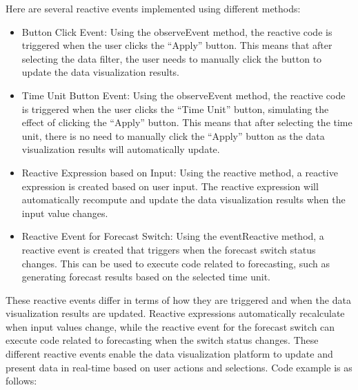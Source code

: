 \documentclass[
  11pt,
]{article}
\begin{document}
Here are several reactive events implemented using different methods:

\begin{itemize}
\item
  Button Click Event: Using the observeEvent method, the reactive code
  is triggered when the user clicks the ``Apply'' button. This means
  that after selecting the data filter, the user needs to manually click
  the button to update the data visualization results.
\item
  Time Unit Button Event: Using the observeEvent method, the reactive
  code is triggered when the user clicks the ``Time Unit'' button,
  simulating the effect of clicking the ``Apply'' button. This means
  that after selecting the time unit, there is no need to manually click
  the ``Apply'' button as the data visualization results will
  automatically update.
\item
  Reactive Expression based on Input: Using the reactive method, a
  reactive expression is created based on user input. The reactive
  expression will automatically recompute and update the data
  visualization results when the input value changes.
\item
  Reactive Event for Forecast Switch: Using the eventReactive method, a
  reactive event is created that triggers when the forecast switch
  status changes. This can be used to execute code related to
  forecasting, such as generating forecast results based on the selected
  time unit.
\end{itemize}

These reactive events differ in terms of how they are triggered and when
the data visualization results are updated. Reactive expressions
automatically recalculate when input values change, while the reactive
event for the forecast switch can execute code related to forecasting
when the switch status changes. These different reactive events enable
the data visualization platform to update and present data in real-time
based on user actions and selections. Code example is as follows:
\end{document}
